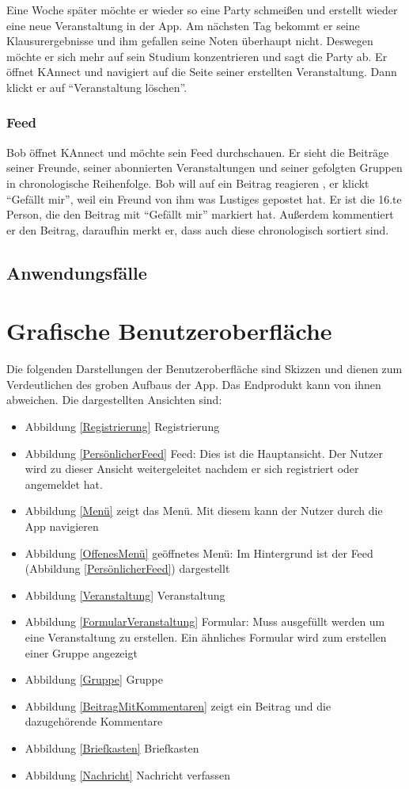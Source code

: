 \documentclass[parskip=full]{scrartcl}
\begin{document}
		Eine Woche später möchte er wieder so eine Party schmeißen und erstellt wieder eine neue Veranstaltung in der App. Am nächsten Tag bekommt er seine Klausurergebnisse und ihm gefallen seine Noten überhaupt nicht. Deswegen möchte er sich mehr auf sein Studium konzentrieren und sagt die Party ab. Er öffnet KAnnect und navigiert auf die Seite seiner erstellten Veranstaltung. Dann klickt er auf “Veranstaltung löschen”.
		
		\subsubsection{\gls{Feed}}
		Bob öffnet KAnnect und möchte sein \gls{Feed} durchschauen. Er sieht die Beiträge seiner Freunde, seiner abonnierten Veranstaltungen und seiner gefolgten Gruppen in chronologische Reihenfolge.
		Bob will auf ein Beitrag reagieren , er klickt “Gefällt mir”, weil ein Freund von ihm was Lustiges gepostet hat. Er ist die 16.te Person, die den Beitrag mit “Gefällt mir” markiert hat. Außerdem kommentiert er den Beitrag, daraufhin merkt er, dass auch diese chronologisch sortiert sind.
	
	\subsection{Anwendungsfälle}
	
	\newpage
	\section{Grafische Benutzeroberfläche}
	Die folgenden Darstellungen der Benutzeroberfläche sind Skizzen und dienen zum Verdeutlichen des groben Aufbaus der App. Das Endprodukt kann von ihnen abweichen.
	Die dargestellten Ansichten sind: 
	\begin{itemize}
		\item Abbildung \ref{Registrierung} Registrierung
		\item Abbildung \ref{PersönlicherFeed} Feed: Dies ist die Hauptansicht. Der Nutzer wird zu dieser Ansicht weitergeleitet nachdem er sich registriert oder angemeldet hat.
		\item Abbildung \ref{Menü} zeigt das Menü. Mit diesem kann der Nutzer durch die App navigieren
		\item Abbildung \ref{OffenesMenü} geöffnetes Menü: Im Hintergrund ist der \gls{Feed} (Abbildung \ref{PersönlicherFeed}) dargestellt
		\item Abbildung \ref{Veranstaltung} Veranstaltung
		\item Abbildung \ref{FormularVeranstaltung} Formular: Muss ausgefüllt werden um eine Veranstaltung zu erstellen. Ein ähnliches Formular wird zum erstellen einer Gruppe angezeigt
		\item Abbildung \ref{Gruppe} Gruppe
		\item Abbildung \ref{BeitragMitKommentaren} zeigt ein Beitrag und die dazugehörende Kommentare
		\item Abbildung \ref{Briefkasten} Briefkasten
		\item Abbildung \ref{Nachricht} Nachricht verfassen
	\end{itemize}
\end{document}
